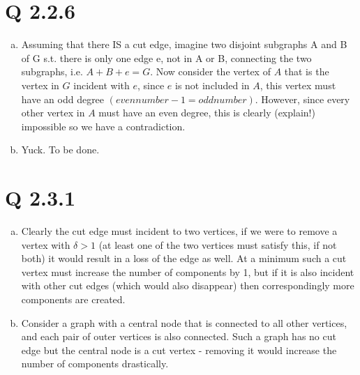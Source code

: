\section{Q 2.2.6}
\begin{enumerate}[(a)]
\item Assuming that there IS a cut edge, imagine two disjoint subgraphs A and B of G s.t. there is only one edge e, not in A or B, connecting the two subgraphs, i.e. $A+B+e = G$. Now consider the vertex of $A$ that is the vertex in $G$ incident with $e$, since $e$ is not included in $A$, this vertex must have an odd degree $(even number - 1 = odd number)$. However, since every other vertex in $A$ must have an even degree, this is clearly (explain!) impossible so we have a contradiction.

\item Yuck. To be done.

\end{enumerate}

\section{Q 2.3.1}
\begin{enumerate}[(a)]
\item Clearly the cut edge must incident to two vertices, if we were to remove a vertex with $\delta>1$ (at least one of the two vertices must satisfy this, if not both) it would result in a loss of the edge as well. At a minimum such a cut vertex must increase the number of components by 1, but if it is also incident with other cut edges (which would also disappear) then correspondingly more components are created.

\item Consider a graph with a central node that is connected to all other vertices, and each pair of outer vertices is also connected. Such a graph has no cut edge but the central node is a cut vertex - removing it would increase the number of components drastically.

\end{enumerate}

